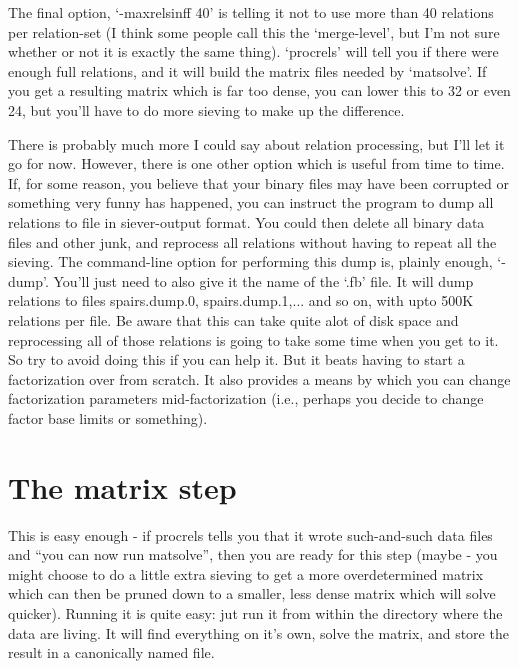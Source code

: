 \documentclass[12pt]{article}
\begin{document}
  The final option, `-maxrelsinff 40' is telling it not to use more than
  40 relations per relation-set (I think some people call this the `merge-level',
  but I'm not sure whether or not it is exactly the same thing).
  `procrels' will tell you if there were enough full relations, and it will
  build the matrix files needed by `matsolve'.
  If you get a resulting matrix which is far too
  dense, you can lower this to 32 or even 24, but you'll have to do more
  sieving to make up the difference.

  There is probably much more I could say about relation processing, but I'll let
  it go for now. However, there is one other option which is useful from
  time to time. If, for some reason, you believe that your binary files may
  have been corrupted or something very funny has happened, you can instruct
  the program to dump all relations to file in siever-output format. You could
  then delete all binary data files and other junk, and reprocess all relations
  without having to repeat all the sieving. The command-line option for performing
  this dump is, plainly enough, `-dump'. You'll just need to also give it
  the name of the `.fb' file. It will dump relations to files spairs.dump.0,
  spairs.dump.1,... and so on, with upto 500K relations per file. Be aware
  that this can take quite alot of disk space and reprocessing all of those
  relations is going to take some time when you get to it. So try to avoid
  doing this if you can help it. But it beats having to start a factorization
  over from scratch. It also provides a means by which you can change factorization
  parameters mid-factorization (i.e., perhaps you decide to change factor
  base limits or something). 

\section{The matrix step}
  This is easy enough - if procrels tells you that it wrote
  such-and-such data files and ``you can now run matsolve'', then
  you are ready for this step (maybe - you might choose to 
  do a little extra sieving to get a more overdetermined matrix
  which can then be pruned down to a smaller, less dense matrix
  which will solve quicker).
  Running it is quite easy: jut run it from within the directory
  where the data are living. It will find everything on it's own,
  solve the matrix, and store the result in a canonically named file.
\end{document}
